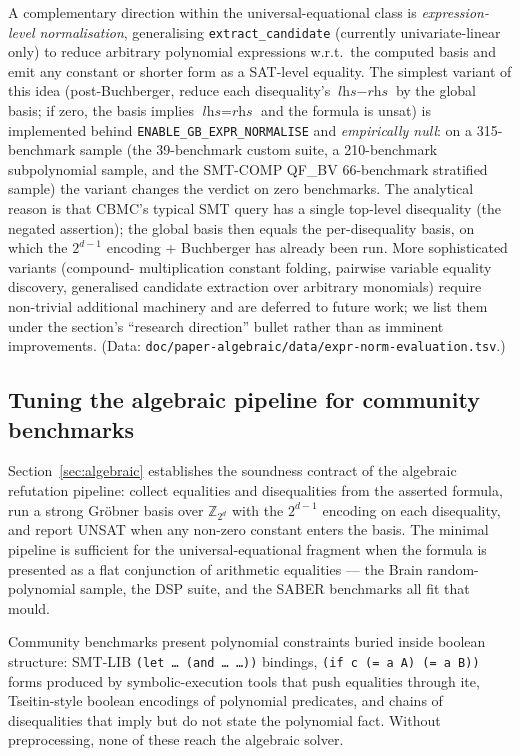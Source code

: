 \documentclass[runningheads]{llncs}
\begin{document}
A complementary direction within the universal-equational class
is \emph{expression-level normalisation}, generalising
\texttt{extract\_candidate} (currently univariate-linear only) to
reduce arbitrary polynomial expressions w.r.t.\ the computed
basis and emit any constant or shorter form as a SAT-level
equality. The simplest variant of this idea (post-Buchberger,
reduce each disequality's $\textit{lhs} - \textit{rhs}$ by the
global basis; if zero, the basis implies $\textit{lhs} =
\textit{rhs}$ and the formula is unsat) is implemented behind
\texttt{ENABLE\_GB\_EXPR\_NORMALISE} and \emph{empirically null}:
on a 315-benchmark sample (the 39-benchmark custom suite,
a 210-benchmark subpolynomial sample, and the SMT-COMP
QF\_BV 66-benchmark stratified sample) the variant changes the
verdict on zero benchmarks. The analytical reason is that
CBMC's typical SMT query has a single top-level disequality
(the negated assertion); the global basis then equals the
per-disequality basis, on which the $2^{d-1}$ encoding + Buchberger has
already been run. More sophisticated variants (compound-
multiplication constant folding, pairwise variable equality
discovery, generalised candidate extraction over arbitrary
monomials) require non-trivial additional machinery and are
deferred to future work; we list them under the section's
``research direction'' bullet rather than as imminent
improvements. (Data:
\texttt{doc/paper-algebraic/data/expr-norm-evaluation.tsv}.)

\subsection{Tuning the algebraic pipeline for community
benchmarks}
\label{sec:algebraic-tuning}

Section~\ref{sec:algebraic} establishes the soundness contract
of the algebraic refutation pipeline: collect equalities and
disequalities from the asserted formula, run a strong
Gr\"obner basis over $\mathbb{Z}_{2^d}$ with the $2^{d-1}$ encoding on
each disequality, and report UNSAT when any non-zero constant enters
the basis. The minimal pipeline is sufficient for the
universal-equational fragment when the formula is presented as
a flat conjunction of arithmetic equalities --- the Brain
random-polynomial sample, the DSP suite, and the SABER
benchmarks all fit that mould.

Community benchmarks present polynomial constraints buried
inside boolean structure: SMT-LIB \texttt{(let \ldots\ (and
\ldots\ \ldots))} bindings, \texttt{(if c (= a A) (= a B))}
forms produced by symbolic-execution tools that push equalities
through ite, Tseitin-style boolean encodings of polynomial
predicates, and chains of disequalities that imply but do not
state the polynomial fact. Without preprocessing, none of these
reach the algebraic solver.
\end{document}
